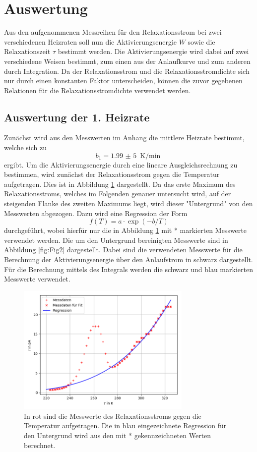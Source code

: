 \section{Auswertung}
Aus den aufgenommenen Messreihen für den Relaxationsstrom bei zwei verschiedenen Heizraten soll
nun die Aktivierungsenergie $W$ sowie die Relaxationszeit $\tau$ bestimmt werden. Die Aktivierungsenergie
wird dabei auf zwei verschiedene Weisen bestimmt, zum einen aus der Anlaufkurve und zum anderen
durch Integration. Da der Relaxationsstrom und die Relaxationsstromdichte sich nur durch einen
konstanten Faktor unterscheiden, können die zuvor gegebenen Relationen für die Relaxationsstromdichte
verwendet werden.

\subsection{Auswertung der 1. Heizrate}
Zunächst wird aus den Messwerten im Anhang die mittlere Heizrate bestimmt, welche
sich zu
\begin{equation}
  b_1=\SI{1,99(5)}{\K\per\min}
\end{equation}
ergibt.
Um die Aktivierungsenergie durch eine lineare Ausgleichsrechnung zu bestimmen, wird zunächst
der Relaxationsstrom gegen die Temperatur aufgetragen. Dies ist in Abbildung \ref{fig:Fig1}
dargestellt. Da das erste Maximum des Relaxationsstroms,
welches im Folgenden genauer untersucht wird, auf der steigenden Flanke des zweiten Maximums
liegt, wird dieser "Untergrund" von den Messwerten abgezogen. Dazu wird eine Regression der
Form
\begin{equation}
  f(T)=a\cdot\exp(-b/T)
\end{equation}
durchgeführt, wobei hierfür nur die in Abbildung \ref{fig:Fig1} mit * markierten Messwerte verwendet werden.
Die um den Untergrund bereinigten Messwerte sind in Abbildung \ref{fig:Fig2} dargestellt. Dabei sind die
verwendeten Messwerte für die Berechnung der Aktivierungsenergie über den Anlaufstrom in schwarz dargestellt.
Für die Berechnung mittels des Integrals werden die schwarz und blau markierten Messwerte verwendet.

\begin{figure}[H]
  \centering
  \includegraphics[width=0.75\textwidth]{Dipol1mitUntergrund.png}
  \caption{In rot sind die Messwerte des Relaxationsstroms gegen die Temperatur aufgetragen. Die in
  blau eingezeichnete Regression für den Untergrund wird aus den mit * gekennzeichneten
  Werten berechnet.}
  \label{fig:Fig1}
\end{figure}

